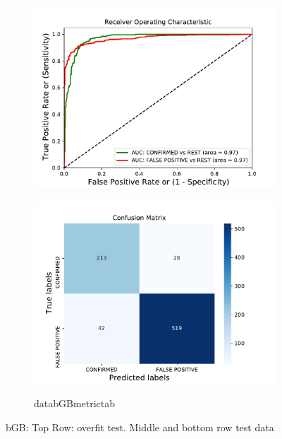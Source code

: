 \begin{figure}[H]
\begin{subfigure}{.49\textwidth}
                \includegraphics[width = 1\textwidth]{data/bGB_roc.pdf}
                \end{subfigure}
                \begin{subfigure}{.49\textwidth}
                \includegraphics[width = 1\textwidth]{data/bGB_cm.pdf}
                \end{subfigure}
                \begin{subfigure}{1\textwidth}
                \csname databGBmetrictab\endcsname
                \end{subfigure}
                \caption{bGB: Top Row: overfit test. Middle and bottom row test data}
                \label{fig:data/bGB_roc}
                \end{figure}